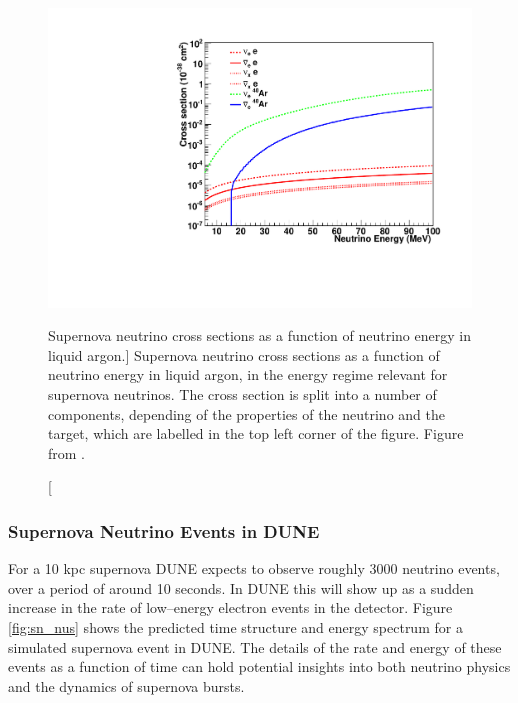 \begin{figure}
	\centering
	\includegraphics[width=\textwidth]{figures/sn_xsec.pdf}
	\caption
	[Supernova neutrino cross sections as a function of neutrino energy in liquid 
	argon.]
	{Supernova neutrino cross sections as a function of neutrino energy in liquid 
	argon, in the energy regime relevant for supernova neutrinos. The cross
	section is split into a number of components, depending of the properties of
	the neutrino and the target, which are labelled in the top left corner of the 
	figure. Figure from \cite{Abi:2020evt}.}
	\label{fig:sn_xsec}
\end{figure}

\subsubsection{Supernova Neutrino Events in DUNE}

For a 10 kpc supernova DUNE expects to observe roughly 3000 neutrino events,
over a period of around 10 seconds. In DUNE this will show up as a sudden
increase in the rate of low--energy electron events in the detector. Figure 
\ref{fig:sn_nus} shows the predicted time structure and energy spectrum for a 
simulated supernova event in DUNE\cite{Abi:2020evt}. The details of the rate 
and energy of these events as a function of time can hold potential insights 
into both neutrino physics and the dynamics of supernova bursts. 

